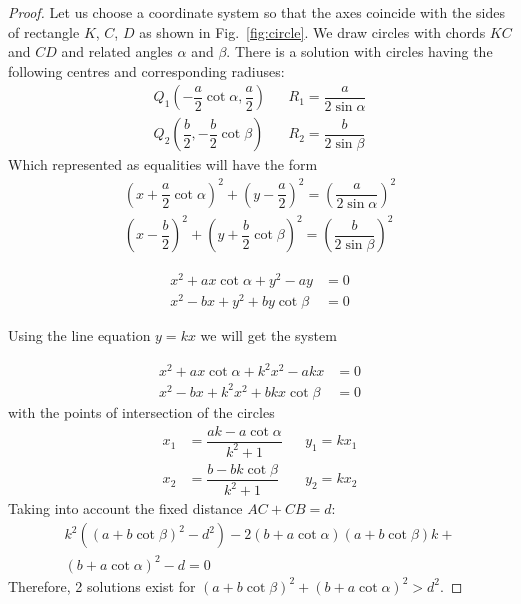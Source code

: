 \documentclass[graybox]{svmult}
\begin{document}
\begin{proof}
Let us choose a coordinate system so that the axes coincide with the sides of rectangle $K$, $C$, $D$ as shown in Fig.~\ref{fig:circle}.
We draw circles with chords $KC$ and $CD$ and related angles $\alpha$ and $\beta$.
There is a solution with  circles having the following centres and corresponding radiuses:
\begin{align*} 
Q_1 (-\dfrac{a}{2}\cot{\alpha}, \dfrac{a}{2}) & & R_1 = \dfrac{a}{2\sin{\alpha}} \\ 
Q_2 (\dfrac{b}{2}, -\dfrac{b}{2}\cot{\beta}) & & R_2 = \dfrac{b}{2\sin{\beta}}
\end{align*}
Which represented as equalities will have the form
\begin{gather*} 
\left(x + \dfrac{a}{2} \cot{\alpha}\right)^2 + \left(y - \dfrac{a}{2} \right)^2 = \left( \dfrac{a}{2\sin\alpha} \right)^2\\ 
\left(x - \dfrac{b}{2} \right)^2 + \left(y + \dfrac{b}{2} \cot{\beta} \right)^2 = \left( \dfrac{b}{2\sin\beta} \right)^2
\end{gather*}

\begin{align*}
x^2 + ax \cot \alpha + y^2 - ay &= 0 \\
x^2   - bx  + y^2 + by \cot \beta &= 0
\end{align*}

Using the line equation $y = kx$ we will get the system

\begin{align*}
x^2 + ax \cot \alpha + k^2x^2 - akx &= 0 \\
x^2   - bx  + k^2 x^2 + bkx \cot \beta &= 0
\end{align*}
with the points of intersection of the circles
\begin{align*} 
x_1 &=  \dfrac{ak - a\cot{\alpha}}{k^2 + 1} & & y_1 = kx_1\\ 
x_2 &=  \dfrac{b - bk\cot{\beta}}{k^2 + 1} & & y_2 = kx_2
\end{align*}
Taking into account the fixed distance $AC + CB = d$:
\begin{multline*}
k^2 \left ((a + b \cot{\beta})^2 - d^2 \right) - 2 (b + a \cot{\alpha})(a + b \cot{\beta}) k + \\
(b + a \cot{\alpha})^2 -d = 0
\end{multline*}
Therefore, 2 solutions exist for
$(a + b \cot{\beta})^2 + (b + a \cot{\alpha})^2 > d^2$.

\end{proof}
\end{document}
